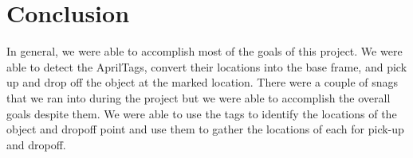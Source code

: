 \section{Conclusion}

In general, we were able to accomplish most of the goals of this project. We were able to detect the AprilTags, convert their locations into the base frame, and pick up and drop off the object at the marked location. There were a couple of snags that we ran into during the project but we were able to accomplish the overall goals despite them. We were able to use the tags to identify the locations of the object and dropoff point and use them to gather the locations of each for pick-up and dropoff. 
